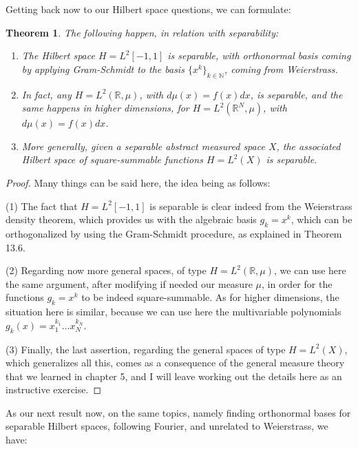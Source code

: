 \documentclass[12pt]{amsbook}
\newtheorem{theorem}{Theorem}[chapter]
\begin{document}
Getting back now to our Hilbert space questions, we can formulate:


\begin{theorem}
The following happen, in relation with separability:
\begin{enumerate}
\item The Hilbert space $H=L^2[-1,1]$ is separable, with orthonormal basis coming by applying Gram-Schmidt to the basis $\{x^k\}_{k\in\mathbb N}$, coming from Weierstrass.

\item In fact, any $H=L^2(\mathbb R,\mu)$, with $d\mu(x)=f(x)dx$, is separable, and the same happens in higher dimensions, for $H=L^2(\mathbb R^N,\mu)$, with $d\mu(x)=f(x)dx$.

\item More generally, given a separable abstract measured space $X$, the associated Hilbert space of square-summable functions $H=L^2(X)$ is separable.
\end{enumerate}
\end{theorem}
 
\begin{proof}
Many things can be said here, the idea being as follows:

\medskip

(1) The fact that $H=L^2[-1,1]$ is separable is clear indeed from the Weierstrass density theorem, which provides us with the algebraic basis $g_k=x^k$, which can be orthogonalized by using the Gram-Schmidt procedure, as explained in Theorem 13.6.

\medskip

(2) Regarding now more general spaces, of type $H=L^2(\mathbb R,\mu)$, we can use here the same argument, after modifying if needed our measure $\mu$, in order for the functions $g_k=x^k$ to be indeed square-summable. As for higher dimensions, the situation here is similar, because we can use here the multivariable polynomials $g_k(x)=x_1^{k_1}\ldots x_N^{k_N}$.

\medskip

(3) Finally, the last assertion, regarding the general spaces of type $H=L^2(X)$, which generalizes all this, comes as a consequence of the general measure theory that we learned in chapter 5, and I will leave working out the details here as an instructive exercise.
\end{proof}

As our next result now, on the same topics, namely finding orthonormal bases for separable Hilbert spaces, following Fourier, and unrelated to Weierstrass, we have:
\end{document}
